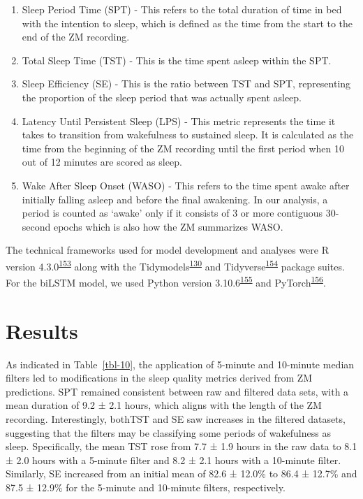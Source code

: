 \documentclass[
  10pt,
]{scrbook}
\providecommand{\tightlist}{%
  \setlength{\itemsep}{0pt}\setlength{\parskip}{0pt}}\usepackage{longtable,booktabs,array}
\begin{document}
\begin{enumerate}
\def\labelenumi{\arabic{enumi}.}
\tightlist
\item
  Sleep Period Time (SPT) - This refers to the total duration of time in
  bed with the intention to sleep, which is defined as the time from the
  start to the end of the ZM recording.
\item
  Total Sleep Time (TST) - This is the time spent asleep within the SPT.
\item
  Sleep Efficiency (SE) - This is the ratio between TST and SPT,
  representing the proportion of the sleep period that was actually
  spent asleep.
\item
  Latency Until Persistent Sleep (LPS) - This metric represents the time
  it takes to transition from wakefulness to sustained sleep. It is
  calculated as the time from the beginning of the ZM recording until
  the first period when 10 out of 12 minutes are scored as sleep.
\item
  Wake After Sleep Onset (WASO) - This refers to the time spent awake
  after initially falling asleep and before the final awakening. In our
  analysis, a period is counted as `awake' only if it consists of 3 or
  more contiguous 30-second epochs which is also how the ZM summarizes
  WASO.
\end{enumerate}

The technical frameworks used for model development and analyses were R
version
4.3.0\textsuperscript{\protect\hyperlink{ref-rcoreteam_2023}{153}} along
with the
Tidymodels\textsuperscript{\protect\hyperlink{ref-kuhn_tidymodels_2020}{130}}
and
Tidyverse\textsuperscript{\protect\hyperlink{ref-wickham_tidyverse_2019}{154}}
package suites. For the biLSTM model, we used Python version
3.10.6\textsuperscript{\protect\hyperlink{ref-vanrossum_python_2009}{155}}
and
PyTorch\textsuperscript{\protect\hyperlink{ref-paszke_pytorch_2019}{156}}.

\hypertarget{results-2}{%
\section{Results}\label{results-2}}

As indicated in Table~\ref{tbl-10}, the application of 5-minute and
10-minute median filters led to modifications in the sleep quality
metrics derived from ZM predictions. SPT remained consistent between raw
and filtered data sets, with a mean duration of 9.2 ± 2.1 hours, which
aligns with the length of the ZM recording. Interestingly, bothTST and
SE saw increases in the filtered datasets, suggesting that the filters
may be classifying some periods of wakefulness as sleep. Specifically,
the mean TST rose from 7.7 ± 1.9 hours in the raw data to 8.1 ± 2.0
hours with a 5-minute filter and 8.2 ± 2.1 hours with a 10-minute
filter. Similarly, SE increased from an initial mean of 82.6 ± 12.0\% to
86.4 ± 12.7\% and 87.5 ± 12.9\% for the 5-minute and 10-minute filters,
respectively.
\end{document}
